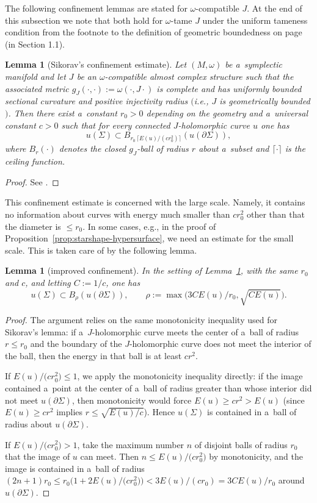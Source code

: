 \documentclass[10pt,a4paper]{amsart}
\numberwithin{equation}{section}
\newtheorem{lm}[Theorem]{Lemma}
\theoremstyle{definition}
\begin{document}
The following confinement lemmas are stated for $\omega$-compatible $J$. At the end of this subsection we note that both hold for $\omega$-tame $J$ under the uniform tameness condition from the footnote to the definition of geometric boundedness on page \pageref{tm:1} (in Section 1.1).


\begin{lm}[Sikorav's confinement estimate]\label{lem:sikorav}
 Let $(M,\omega)$ be a~symplectic manifold and let $J$ be an $\omega$-compatible almost complex structure such that the associated metric $g_J(\cdot,\cdot):=\omega(\cdot,J\cdot)$ is complete and has uniformly bounded sectional curvature and positive injectivity radius $($i.e., $J$ is geometrically bounded$)$.
 Then there exist a~constant $r_0>0$ depending on the geometry and a~universal constant $c>0$ such that for every connected $J$-holomorphic curve $u$ one has
 \[
 u(\Sigma)\subset B_{r_0\,\lceil E(u)/(c r_0^2)\rceil}(u(\partial\Sigma)),
 \]
 where $B_{r}(\cdot)$ denotes the closed $g_J$-ball of radius $r$ about a~subset and $\lceil\cdot\rceil$ is the ceiling function.
 \end{lm}
 \begin{proof}
 See \cite[Proposition 4.4.1]{Sikorav}.
 \end{proof}
 This confinement estimate is concerned with the large scale. Namely, it contains no information about curves with energy much smaller than $cr_0^2$ other than that the diameter is $\leq r_0$. In some cases, e.g., in the proof of Proposition~\ref{prop:starshape-hypersurface}, we need an estimate for the small scale. This is taken care of by the following lemma.
 \begin{lm}[improved confinement]\label{lem:sikorav-improved}
 In the setting of Lemma~{\rm\ref{lem:sikorav}}, with the same $r_0$ and $c$, and letting $C := 1/c$, one has
 \[
 u(\Sigma)\subset B_{\rho}(u(\partial\Sigma)),\qquad \rho:=\max\bigl(3CE(u)/r_0,\sqrt{CE(u)}\bigr).
 \]
 \end{lm}
 \begin{proof}
 The argument relies on the same monotonicity inequality used for Sikorav's lemma: if a~$J$-holomorphic curve meets the center of a~ball of radius $r\le r_0$ and the boundary of the $J$-holomorphic curve does not meet the interior of the ball, then the energy in that ball is at least $c r^2$.

 If $E(u)/\bigl(c r_0^2\bigr)\le 1$, we apply the monotonicity inequality directly: if the image contained a~point at the center of a~ball of radius greater than  whose interior did not meet $u(\partial\Sigma)$, then monotonicity would force $E(u)\ge c r^2>E(u)$ (since $E(u)\ge c r^2$ implies $r\le\sqrt{E(u)/c}$). Hence $u(\Sigma)$ is contained in a~ball of radius  about $u(\partial\Sigma)$.

 If $E(u)/\bigl(c r_0^2\bigr)>1$, take the maximum number $n$ of disjoint balls of radius $r_0$ that the image of $u$ can meet. Then $n\le E(u)/\bigl(c r_0^2\bigr)$ by monotonicity, and the image is contained in a~ball of radius $(2n+1)r_0\le r_0\bigl(1+2E(u)/\bigl(c r_0^2\bigr)\bigr)<3E(u)/(cr_0) = 3CE(u)/r_0$ around $u(\partial\Sigma)$.
 \end{proof}
\end{document}
